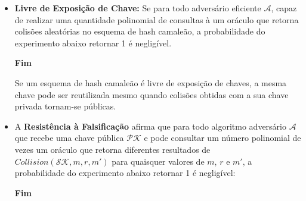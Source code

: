 \documentclass[a4paper]{article}
\begin{document}
    \begin{itemize}  
    \item\textbf{Livre de Exposição de Chave:} Se para todo adversário
      eficiente $\mathcal{A}$, capaz de realizar uma quantidade polinomial
      de consultas à um oráculo que retorna colisões aleatórias no esquema
      de hash camaleão, a probabilidade do experimento abaixo retornar 1 é
      negligível.
    
    \noindent
      \begin{algorithm}[H]
        \SetAlgoLined
         \textbf{Fim}
      \end{algorithm}
    
      Se um esquema de hash camaleão é livre de exposição de chaves, a
      mesma chave pode ser reutilizada mesmo quando colisões obtidas com a
      sua chave privada tornam-se públicas.
      
    \item A \textbf{Resistência à Falsificação} afirma que para todo algoritmo
      adversário $\mathcal{A}$ que recebe uma chave pública $\mathcal{PK}$
      e pode consultar um número polinomial de vezes um oráculo que
      retorna diferentes resultados de $Collision(\mathcal{SK}, m, r, m')$
      para quaisquer valores de $m$, $r$ e $m'$, a probabilidade do
      experimento abaixo retornar 1 é negligível:
    
      \noindent
      \begin{algorithm}[H]
        \SetAlgoLined
         \textbf{Fim}
      \end{algorithm}
    

\end{itemize}
\end{document}
